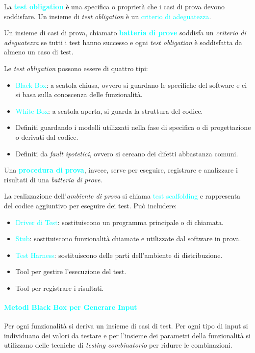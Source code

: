 La \textbf{\textcolor{cyan}{test obligation}} è una specifica o proprietà che i casi
di prova devono soddisfare. Un insieme di \emph{test obligation} è un \textcolor{cyan}{criterio di adeguatezza}.

Un insieme di casi di prova, chiamato \textbf{\textcolor{cyan}{batteria di prove}} soddisfa un \emph{criterio di adeguatezza} se tutti i test
hanno successo e ogni \emph{test obligation} è soddisfatta da almeno un caso di test.

Le \emph{test obligation} possono essere di quattro tipi:
\begin{itemize}
    \item \textcolor{cyan}{Black Box}: a scatola chiusa, ovvero si guardano le specifiche del software e ci
        si basa sulla conoscenza delle funzionalità.
    \item \textcolor{cyan}{White Box}: a scatola aperta, si guarda la struttura del codice.
    \item Definiti guardando i modelli utilizzati nella fase di specifica o di progettazione
        o derivati dal codice.
    \item Definiti da \emph{fault ipotetici}, ovvero si cercano dei difetti abbastanza comuni.
\end{itemize}

Una \textbf{\textcolor{cyan}{procedura di prova}}, invece, serve
per eseguire, registrare e analizzare i risultati di una \emph{batteria di prove}.

La realizzazione dell'\emph{ambiente di prova} si chiama \textcolor{cyan}{test scaffolding} e
rappresenta del codice aggiuntivo per eseguire dei test. Può includere:
\begin{itemize}
    \item \textcolor{cyan}{Driver di Test}: sostituiscono un programma principale o di chiamata.
    \item \textcolor{cyan}{Stub}: sostituiscono funzionalità chiamate e utilizzate dal software in prova.
    \item \textcolor{cyan}{Test Harness}: sostituiscono delle parti dell'ambiente di distribuzione.
    \item Tool per gestire l'esecuzione del test.
    \item Tool per registrare i risultati.
\end{itemize}

\paragraph{\textcolor{cyan}{Metodi Black Box per Generare Input}} Per ogni funzionalità si deriva
un insieme di casi di test. Per ogni tipo di input si individuano dei valori da testare e per l'insieme
dei parametri della funzionalità si utilizzano delle tecniche di \emph{testing combinatorio} per ridurre
le combinazioni.

